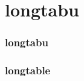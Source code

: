 \documentclass[12pt, a4paper, oneside]{book}
\let\stdsection\section
\renewcommand\section{\newpage\stdsection}
\begin{document}
				\clearpage




	\part{longtabu}
	\noptcrule
	\parttoc				



		\section{	longtabu}				


		\section{	longtable}				
\end{document}
